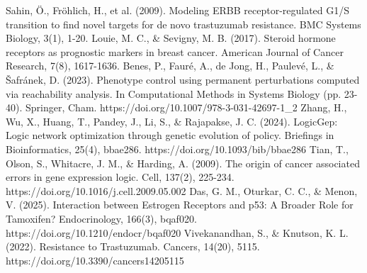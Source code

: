 \documentclass[a4paper,12pt]{article}
\begin{document}
\clearpage


\begin{thebibliography}{99} 
 Sahin, Ö., Fröhlich, H., et al. (2009). Modeling ERBB receptor-regulated G1/S transition to find novel targets for de novo trastuzumab resistance. BMC Systems Biology, 3(1), 1-20.
 Louie, M. C., \& Sevigny, M. B. (2017). Steroid hormone receptors as prognostic markers in breast cancer. American Journal of Cancer Research, 7(8), 1617-1636.
 Benes, P., Fauré, A., de Jong, H., Paulevé, L., \& Šafránek, D. (2023). Phenotype control using permanent perturbations computed via reachability analysis. In Computational Methods in Systems Biology (pp. 23-40). Springer, Cham. https://doi.org/10.1007/978-3-031-42697-1\_2
 Zhang, H., Wu, X., Huang, T., Pandey, J., Li, S., \& Rajapakse, J. C. (2024). LogicGep: Logic network optimization through genetic evolution of policy. Briefings in Bioinformatics, 25(4), bbae286. https://doi.org/10.1093/bib/bbae286
 Tian, T., Olson, S., Whitacre, J. M., \& Harding, A. (2009). The origin of cancer associated errors in gene expression logic. Cell, 137(2), 225-234. https://doi.org/10.1016/j.cell.2009.05.002
 Das, G. M., Oturkar, C. C., \& Menon, V. (2025). Interaction between Estrogen Receptors and p53: A Broader Role for Tamoxifen? Endocrinology, 166(3), bqaf020. https://doi.org/10.1210/endocr/bqaf020
 Vivekanandhan, S., \& Knutson, K. L. (2022). Resistance to Trastuzumab. Cancers, 14(20), 5115. https://doi.org/10.3390/cancers14205115
\end{thebibliography}
\end{document}
